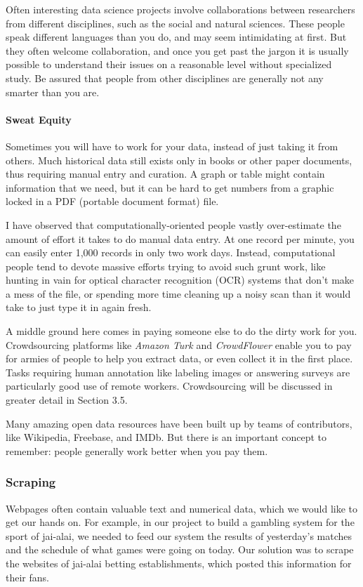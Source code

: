 \documentclass[10pt]{article}
\begin{document}
Often interesting data science projects involve collaborations between researchers from different disciplines, such as the social and natural sciences. These people speak different languages than you do, and may seem intimidating at first. But they often welcome collaboration, and once you get past the jargon it is usually possible to understand their issues on a reasonable level without specialized study. Be assured that people from other disciplines are generally not any smarter than you are.

\paragraph{Sweat Equity}
Sometimes you will have to work for your data, instead of just taking it from others. Much historical data still exists only in books or other paper documents, thus requiring manual entry and curation. A graph or table might contain information that we need, but it can be hard to get numbers from a graphic locked in a PDF (portable document format) file.

I have observed that computationally-oriented people vastly over-estimate the amount of effort it takes to do manual data entry. At one record per minute, you can easily enter 1,000 records in only two work days. Instead, computational people tend to devote massive efforts trying to avoid such grunt work, like hunting in vain for optical character recognition (OCR) systems that don’t make a mess of the file, or spending more time cleaning up a noisy scan than it would take to just type it in again fresh.

A middle ground here comes in paying someone else to do the dirty work for you. Crowdsourcing platforms like \textit{Amazon Turk} and \textit{CrowdFlower} enable you to pay for armies of people to help you extract data, or even collect it in the first place. Tasks requiring human annotation like labeling images or answering surveys are particularly good use of remote workers. Crowdsourcing will be discussed in greater detail in Section 3.5.

Many amazing open data resources have been built up by teams of contributors, like Wikipedia, Freebase, and IMDb. But there is an important concept to remember: people generally work better when you pay them.

\subsubsection{Scraping}
Webpages often contain valuable text and numerical data, which we would like to get our hands on. For example, in our project to build a gambling system for the sport of jai-alai, we needed to feed our system the results of yesterday’s matches and the schedule of what games were going on today. Our solution was to scrape the websites of jai-alai betting establishments, which posted this information for their fans.
\end{document}
